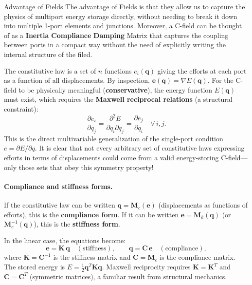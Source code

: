 \begin{insightbox}{Advantage of Fields}
  The advantage of Fields is that they allow us to capture the physics of multiport energy storage directly, without needing to break it down into multiple 1-port elements and junctions. Moreover, a C-field can be thought of as a \textbf{Inertia} \textbf{Compliance} \textbf{Damping} Matrix that captures the coupling between ports in a compact way without the need of explicitly writing the internal structure of the filed. 
\end{insightbox}


The constitutive law is a set of $n$ functions $e_i(\mathbf{q})$ giving the efforts at each port as a function of all displacements. By inspection, $\mathbf{e}(\mathbf{q}) = \nabla E(\mathbf{q})$. For the C-field to be physically meaningful (\textbf{conservative}), the energy function $E(\mathbf{q})$ must exist, which requires the \textbf{Maxwell reciprocal relations} (a structural constraint):
\begin{equation}
  \frac{\partial e_i}{\partial q_j} = \frac{\partial^2 E}{\partial q_i \partial q_j} = \frac{\partial e_j}{\partial q_i} \quad \forall\, i,j.
  \label{eq:maxwell}
\end{equation}
This is the direct multivariable generalization of the single-port condition $e = \partial E/\partial q$. It is clear that not every arbitrary set of constitutive laws expressing efforts in terms of displacements could come from a valid energy-storing C-field—only those sets that obey this symmetry property!

\paragraph{Compliance and stiffness forms.}
If the constitutive law can be written $\mathbf{q} = \mathbf{M}_c(\mathbf{e})$ (displacements as functions of efforts), this is the \textbf{compliance form}. If it can be written $\mathbf{e} = \mathbf{M}_k(\mathbf{q})$ (or $\mathbf{M}_c^{-1}(\mathbf{q})$), this is the \textbf{stiffness form}. 

In the linear case, the equations become:
\begin{equation}
  \mathbf{e} = \mathbf{K}\,\mathbf{q} \quad (\text{stiffness}), \qquad
  \mathbf{q} = \mathbf{C}\,\mathbf{e} \quad (\text{compliance}),
\end{equation}
where $\mathbf{K} = \mathbf{C}^{-1}$ is the stiffness matrix and $\mathbf{C} = \mathbf{M}_c$ is the compliance matrix. The stored energy is $E = \frac{1}{2}\mathbf{q}^T\mathbf{K}\mathbf{q}$. Maxwell reciprocity requires $\mathbf{K} = \mathbf{K}^T$ and $\mathbf{C} = \mathbf{C}^T$ (symmetric matrices), a familiar result from structural mechanics.

